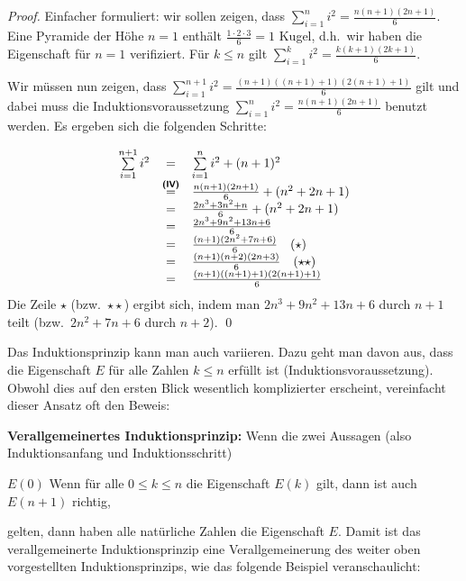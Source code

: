 \goodbreak
\begin{proof}
Einfacher formuliert: wir sollen zeigen, dass $\sum\limits_{i=1}^n i^2 =
\frac{n(n+1)(2n+1)}{6}$.
\induproof%
{Eine Pyramide der Höhe $n = 1$ enthält $\frac{1 \cdot 2 \cdot 3}{6} =
  1$ Kugel, d.h.~wir haben die Eigenschaft für $n = 1$ verifiziert.}%
{Für $k \le n$ gilt $\sum\limits_{i=1}^k i^2 = \frac{k(k+1)(2k+1)}{6}$.}%
{%
Wir müssen nun zeigen, dass $\sum\limits_{i=1}^{n+1} i^2 =
\frac{(n+1)((n+1)+1)(2(n+1)+1)}{6}$ gilt und dabei muss die
Induktionsvoraussetzung $\sum\limits_{i=1}^n i^2 = \frac{n(n+1)(2n+1)}{6}$
benutzt werden. Es ergeben sich die folgenden Schritte: 

\begin{displaymath}
\begin{array}{rcl}
\sum\limits_{i=1}^{n+1}i^2 &=& \sum\limits_{i=1}^{n}i^2 + (n + 1)^2\\
&\stackrel{\text{\textbf{\textsf{(IV)}}}}{=}& \frac{n(n+1)(2n+1)}{6} +
(n^2 + 2n + 1)\\
&=& \frac{2n^3 + 3n^2+n}{6} + (n^2 + 2n + 1)\\
&=& \frac{2n^3 + 9n^2+13n + 6}{6}\\
&=& \frac{(n+1)(2n^2+7n+6)}{6} \quad (\star)\\
&=& \frac{(n+1)(n+2)(2n+3)}{6} \quad (\star\star)\\
&=& \frac{(n+1)((n+1) + 1)(2(n + 1) + 1)}{6}\\
\end{array}
\end{displaymath}
Die Zeile $\star$ (bzw.~$\star\star$) ergibt sich, indem man $2n^3 +
9n^2+13n + 6$ durch $n+1$ teilt (bzw.~$2n^2+7n+6$ durch $n+2$). \qed
}
\end{proof}
\smallskip

\noindent Das Induktionsprinzip kann man auch variieren. Dazu geht man davon 
aus, dass die Eigenschaft $E$ für alle Zahlen $k \le n$ 
erfüllt ist (Induktionsvoraussetzung). Obwohl dies auf den ersten Blick wesentlich 
komplizierter erscheint, vereinfacht dieser Ansatz oft den Beweis:

\medskip

\goodbreak
\noindent\textbf{Verallgemeinertes Induktionsprinzip:} Wenn die zwei
Aussagen (also Induktionsanfang
und Induktionsschritt)

\indudef%
{$E(0)$}%
{Wenn für alle $0 \le k \le n$ die Eigenschaft $E(k)$ gilt, dann ist 
auch $E(n+1)$ richtig,}
\medskip

gelten, dann haben alle natürliche Zahlen die Eigenschaft $E$.
Damit ist das verallgemeinerte Induktionsprinzip eine
Verallgemeinerung des weiter oben vorgestellten Induktionsprinzips, wie das
folgende Beispiel veranschaulicht:

